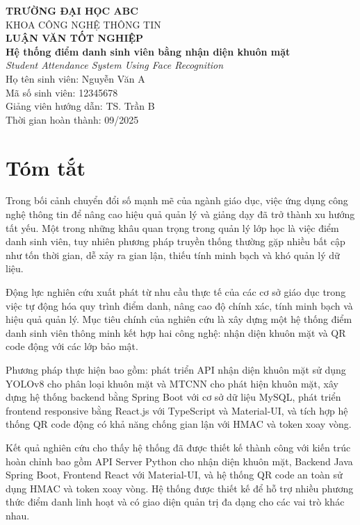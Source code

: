 \documentclass[12pt,a4paper]{report}
\begin{document}
\begin{titlepage}
    \centering
    {\bfseries\LARGE TRƯỜNG ĐẠI HỌC ABC\\[1em]}
    {\Large KHOA CÔNG NGHỆ THÔNG TIN\\[2em]}
    {\Huge\bfseries LUẬN VĂN TỐT NGHIỆP\\[1em]}
    {\Large\bfseries Hệ thống điểm danh sinh viên bằng nhận diện khuôn mặt\\}
    {\large\itshape Student Attendance System Using Face Recognition\\[2em]}
    \vfill
    {\large Họ tên sinh viên: Nguyễn Văn A\\}
    {\large Mã số sinh viên: 12345678\\[1em]}
    {\large Giảng viên hướng dẫn: TS. Trần B\\[1em]}
    {\large Thời gian hoàn thành: 09/2025\\}
    \vfill
\end{titlepage}

\chapter*{Tóm tắt}
Trong bối cảnh chuyển đổi số mạnh mẽ của ngành giáo dục, việc ứng dụng công nghệ thông tin để nâng cao hiệu quả quản lý và giảng dạy đã trở thành xu hướng tất yếu. Một trong những khâu quan trọng trong quản lý lớp học là việc điểm danh sinh viên, tuy nhiên phương pháp truyền thống thường gặp nhiều bất cập như tốn thời gian, dễ xảy ra gian lận, thiếu tính minh bạch và khó quản lý dữ liệu.

Động lực nghiên cứu xuất phát từ nhu cầu thực tế của các cơ sở giáo dục trong việc tự động hóa quy trình điểm danh, nâng cao độ chính xác, tính minh bạch và hiệu quả quản lý. Mục tiêu chính của nghiên cứu là xây dựng một hệ thống điểm danh sinh viên thông minh kết hợp hai công nghệ: nhận diện khuôn mặt và QR code động với các lớp bảo mật.

Phương pháp thực hiện bao gồm: phát triển API nhận diện khuôn mặt sử dụng YOLOv8 cho phân loại khuôn mặt và MTCNN cho phát hiện khuôn mặt, xây dựng hệ thống backend bằng Spring Boot với cơ sở dữ liệu MySQL, phát triển frontend responsive bằng React.js với TypeScript và Material-UI, và tích hợp hệ thống QR code động có khả năng chống gian lận với HMAC và token xoay vòng.

Kết quả nghiên cứu cho thấy hệ thống đã được thiết kế thành công với kiến trúc hoàn chỉnh bao gồm API Server Python cho nhận diện khuôn mặt, Backend Java Spring Boot, Frontend React với Material-UI, và hệ thống QR code an toàn sử dụng HMAC và token xoay vòng. Hệ thống được thiết kế để hỗ trợ nhiều phương thức điểm danh linh hoạt và có giao diện quản trị đa dạng cho các vai trò khác nhau.
\end{document}
